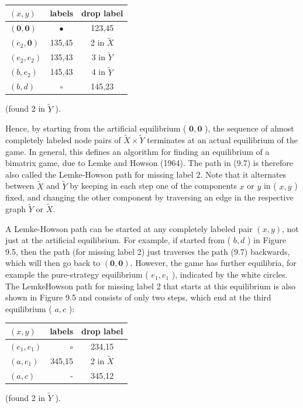 \documentclass[12pt]{article}
\begin{document}
\begin{center}
\begin{tabular}{lcc}
$(x, y)$ & labels & drop label \\
\hline
$(\mathbf{0}, \mathbf{0})$ & $\bullet$ & 123,45 \\
$\left(e_{2}, \mathbf{0}\right)$ & 135,45 & 2 in $\tilde{X}$ \\
$\left(e_{2}, e_{2}\right)$ & 135,43 & 3 in $\tilde{Y}$ \\
$\left(b, e_{2}\right)$ & 145,43 & 4 in $\tilde{Y}$ \\
$(b, d)$ & $\square$ & 145,23 \\
\end{tabular}
\end{center} (found 2 in $\tilde{Y}$ ).

Hence, by starting from the artificial equilibrium ( $\mathbf{0}, \mathbf{0}$ ), the sequence of almost completely labeled node pairs of $\tilde{X} \times \tilde{Y}$ terminates at an actual equilibrium of the game. In general, this defines an algorithm for finding an equilibrium of a bimatrix game, due to Lemke and Howson (1964). The path in (9.7) is therefore also called the Lemke-Howson path for missing label 2. Note that it alternates between $\tilde{X}$ and $\tilde{Y}$ by keeping in each step one of the components $x$ or $y$ in ( $x, y$ ) fixed, and changing the other component by traversing an edge in the respective graph $\tilde{Y}$ or $\tilde{X}$.

A Lemke-Howson path can be started at any completely labeled pair $(x, y)$, not just at the artificial equilibrium. For example, if started from ( $b, d$ ) in Figure 9.5, then the path (for missing label 2) just traverses the path (9.7) backwards, which will then go back to $(\mathbf{0}, \mathbf{0})$. However, the game has further equilibria, for example the pure-strategy equilibrium ( $e_{1}, e_{1}$ ), indicated by the white circles. The LemkeHowson path for missing label 2 that starts at this equilibrium is also shown in Figure 9.5 and consists of only two steps, which end at the third equilibrium ( $a, c$ ):

\begin{center}
\begin{tabular}{lrc}
$(x, y)$ & labels & drop label \\
\hline
$\left(e_{1}, e_{1}\right)$ & $\circ$ & 234,15 \\
$\left(a, e_{1}\right)$ & 345,15 & 2 in $\tilde{X}$ \\
$(a, c)$ & - & 345,12 \\
\end{tabular}
\end{center} (found 2 in $\tilde{Y}$ ).
\end{document}
